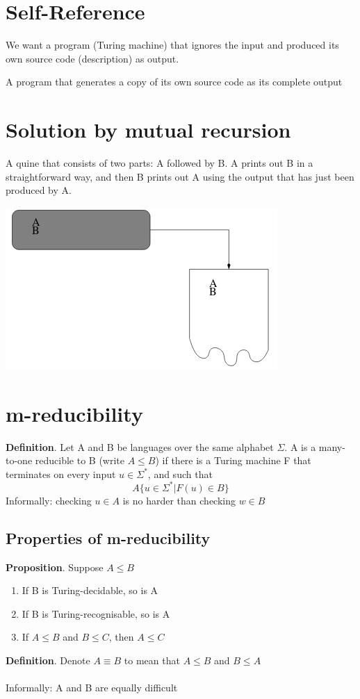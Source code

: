 \documentclass{article}[18pt]
\begin{document}
\section{Self-Reference}
We want a program (Turing machine) that ignores the input and produced its own source code (description) as output.
\begin{defin}[Quine]
A program that generates a copy of its own source code as its complete output
\end{defin}
\section{Solution by mutual recursion}
A quine that consists of two parts: A followed by B. A prints out B in a straightforward way, and then B prints out A using the output that has just been produced by A.
\begin{center}
	\includegraphics[scale=0.7]{"Mutual Recursion"}
\end{center}
\section{m-reducibility}
\textbf{Definition}. Let A and B be languages over the same alphabet $\Sigma$. A is a many-to-one reducible to B (write $A\leqslant B$) if there is a Turing machine F that terminates on every input $u\in \Sigma^*$, and such that
$$A\{u\in \Sigma^*|F(u)\in B\}$$
Informally: checking $u\in A$ is no harder than checking $w\in B$
\subsection{Properties of m-reducibility}
\textbf{Proposition}. Suppose $A\leqslant B$
\begin{enumerate}
	\item If B is Turing-decidable, so is A
	\item If B is Turing-recognisable, so is A
	\item If $A\leqslant B$ and $B\leqslant C$, then $A\leqslant C$
\end{enumerate}
\textbf{Definition}. Denote $A\equiv B$ to mean that $A\leqslant B$ and $B\leqslant A$\\
\\
Informally: A and B are equally difficult
\end{document}
